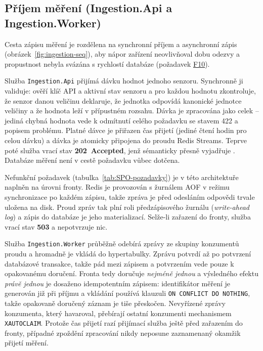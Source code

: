 \subsection{Příjem měření (Ingestion.Api a Ingestion.Worker)}

Cesta zápisu měření je rozdělena na synchronní příjem a asynchronní zápis (obrázek~\ref{fig:ingestion-seq}), aby nápor zařízení neovlivňoval dobu odezvy a propustnost nebyla svázána s rychlostí databáze (požadavek \hyperref[tab:funkcni-pozadavky]{F10}).

Služba \texttt{Ingestion.Api} přijímá dávku hodnot jednoho senzoru. Synchronně ji validuje: ověří klíč API a aktivní stav senzoru a pro každou hodnotu zkontroluje, že senzor danou veličinu deklaruje, že jednotka odpovídá kanonické jednotce veličiny a že hodnota leží v přípustném rozsahu. Dávka je zpracována jako celek -- jediná chybná hodnota vede k odmítnutí celého požadavku se stavem 422 a popisem problému. Platné dávce je přiřazen čas přijetí (jediné čtení hodin pro celou dávku) a dávka je atomicky připojena do proudu Redis Streams. Teprve poté služba vrací stav \textbf{202~Accepted}, jenž sémanticky přesně vyjadřuje . Databáze měření není v cestě požadavku vůbec dotčena.

Nefunkční požadavek  (tabulka~\ref{tab:SPO-pozadavky}) je v této architektuře naplněn na úrovni fronty. Redis je provozován s žurnálem AOF v režimu synchronizace po každém zápisu, takže zpráva je před odesláním odpovědi trvale uložena na disk. Proud zpráv tak plní roli předzápisového žurnálu (\emph{write-ahead log}) a zápis do databáze je jeho materializací. Selže-li zařazení do fronty, služba vrací stav \textbf{503} a nepotvrzuje nic.

Služba \texttt{Ingestion.Worker} průběžně odebírá zprávy ze skupiny konzumentů proudu a hromadně je vkládá do hypertabulky. Zprávu potvrdí až po potvrzení databázové transakce, takže pád mezi zápisem a potvrzením vede pouze k opakovanému doručení. Fronta tedy doručuje \emph{nejméně jednou} a výsledného efektu \emph{právě jednou} je dosaženo idempotentním zápisem: identifikátor měření je generován již při příjmu a vkládání používá klauzuli \texttt{ON CONFLICT DO NOTHING}, takže opakovaně doručený záznam je tiše přeskočen. Nevyřízené zprávy konzumenta, který havaroval, přebírají ostatní konzumenti mechanismem \texttt{XAUTOCLAIM}. Protože čas přijetí razí přijímací služba ještě před zařazením do fronty, případné zpoždění zpracování nikdy neposune zaznamenaný okamžik přijetí měření.

